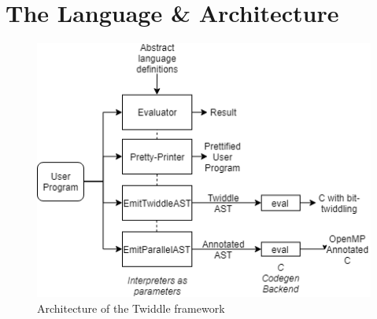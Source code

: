 \documentclass{article}
\begin{document}
\section{The Language \& Architecture}
\begin{figure}[t]
	\centering
	\includegraphics[scale=0.8]{twiddle_arch.png}
	\caption{Architecture of the Twiddle framework}\label{twiddle_arch}
\end{figure}
\end{document}
